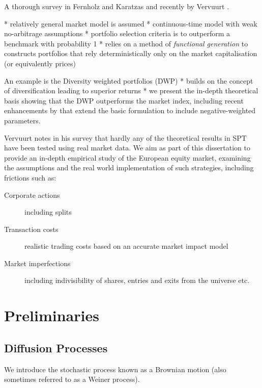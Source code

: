 \documentclass[british]{amsart}
\numberwithin{equation}{section}
\numberwithin{figure}{section}
\theoremstyle{plain}
\theoremstyle{definition}
\theoremstyle{plain}
\theoremstyle{plain}
\theoremstyle{plain}
\theoremstyle{remark}
\theoremstyle{plain}
\begin{document}
A thorough survey in Fernholz and Karatzas \cite{fernholz2009} and recently
by Vervuurt \cite{vervuurt2015}.

* relatively general market model is assumed
* continuous-time model with weak no-arbitrage assumptions
* portfolio selection criteria is to outperform a benchmark with probability 1
* relies on a method of \textit{functional generation} to constructs portfolios
that rely deterministically only on the market capitalisation (or equivalently 
prices)

An example is the Diversity weighted portfolios (DWP)
* builds on the concept of diversification leading to superior returns
* we present the in-depth theoretical basis showing that the DWP outperforms the 
market index, including recent enhancements by \cite{vervuurt2016} that
extend the basic formulation to include negative-weighted parameters.

Vervuurt \cite{vervuurt2015} notes in his survey that hardly any of the 
theoretical results in SPT have been tested using real market data. We aim as 
part of this dissertation to provide an in-depth empirical study of the European 
equity market, examining the assumptions and the real world implementation of
such strategies, including frictions such as:
\begin{description}
	\item [Corporate actions] including splits
	\item [Transaction costs] realistic trading costs based on an accurate 
		market impact model
	\item [Market imperfections] including indivisibility of shares, entries 
		and exits from the universe etc.
\end{description}

\section{Preliminaries}
\subsection{Diffusion Processes}

We introduce the stochastic process known as a Brownian motion (also sometimes 
referred to as a Weiner process).
\end{document}
